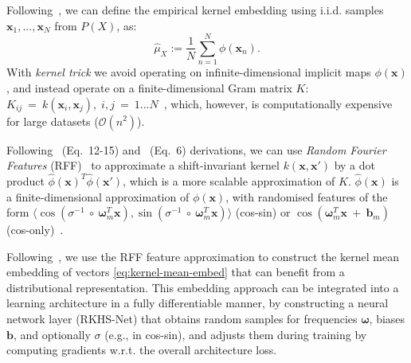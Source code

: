 Following~\cite{antonova2022bayesian}, we can define the empirical kernel embedding using i.i.d. samples $\mathbf{x}_1,...,\mathbf{x}_N$ from $P(X)$, as:
\begin{equation}
\label{eq:kernel-mean-embed}
    \hat{\mu}_X := \frac{1}{N} \sum_{n=1}^{N} \phi(\mathbf{x}_n) \text{.}
\end{equation}
With \emph{kernel trick} we avoid operating on infinite-dimensional implicit maps $\phi(\mathbf{x})$, and instead operate on a finite-dimensional Gram matrix $K$: $K_{ij}~=~k(\mathbf{x}_i, \mathbf{x}_j), \; i,j~=~1...N$~\cite{ghojogh2021reproducing}, which, however, is computationally expensive for large datasets ($\mathcal{O}(n^2)$).

Following~\cite{ramos2019bayessim} (Eq.~12-15) and~\cite{antonova2022bayesian} (Eq.~6) derivations, we can use \emph{Random Fourier Features} (RFF)~\cite{rahimi2007random} to approximate a shift-invariant kernel $k(\mathbf{x}, \mathbf{x}')$ by a dot product $\hat{\phi}(\mathbf{x})^T\hat{\phi}(\mathbf{x}')$, which is a more scalable approximation of $K$. 
$\hat{\phi}(\mathbf{x})$ is a finite-dimensional approximation of $\phi(\mathbf{x})$, with randomised features of the form $\langle \cos(\sigma^{-1}~\circ~\boldsymbol{\omega}_{m}^T\mathbf{x}), \sin(\sigma^{-1}~\circ~\boldsymbol{\omega}_{m}^T\mathbf{x}) \rangle$ (cos-sin) or 
$\cos(\boldsymbol{\omega}_{m}^T\mathbf{x}~+~\mathbf{b}_m)$ (cos-only)~\cite{ramos2023method}. 

Following~\cite{antonova2022bayesian}, we use the RFF feature approximation to construct the kernel mean embedding of vectors \eqref{eq:kernel-mean-embed} that can benefit from a distributional representation.
This embedding approach can be integrated into a learning architecture in a fully differentiable manner, by constructing a neural network layer (RKHS-Net) that obtains random samples for frequencies $\boldsymbol{\omega}$, biases $\mathbf{b}$, and optionally $\sigma$ (e.g., in cos-sin), and adjusts them during training by computing gradients w.r.t. the overall architecture loss.
